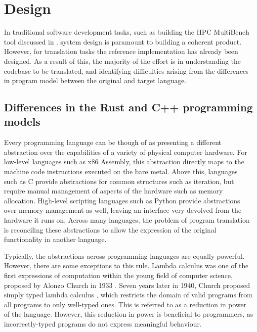 \section{Design}
\label{sec:translation-design}

In traditional software development tasks, such as building the HPC MultiBench tool discussed in , system design is paramount to building a coherent product. However, for translation tasks the reference implementation has already been designed. As a result of this, the majority of the effort is in understanding the codebase to be translated, and identifying difficulties arising from the differences in program model between the original and target language.

\subsection{Differences in the Rust and C++ programming models}
\label{sec:rust-cpp-programming-models}

Every programming language can be though of as presenting a different abstraction over the capabilities of a variety of physical computer hardware. For low-level languages such as x86 Assembly, this abstraction directly maps to the machine code instructions executed on the bare metal. Above this, languages such as C provide abstractions for common structures such as iteration, but require manual management of aspects of the hardware such as memory allocation. High-level scripting languages such as Python provide abstractions over memory management as well, leaving an interface very devolved from the hardware it runs on. Across many languages, the problem of program translation is reconciling these abstractions to allow the expression of the original functionality in another language.

Typically, the abstractions across programming languages are equally powerful. However, there are some exceptions to this rule. Lambda calculus was one of the first expressions of computation within the young field of computer science, proposed by Alonzo Church in 1933 \cite{church1932set}. Seven years later in 1940, Church proposed simply typed lambda calculus \cite{church1940formulation}, which restricts the domain of valid programs from all programs to only well-typed ones. This is referred to as a reduction in power of the language. However, this reduction in power is beneficial to programmers, as incorrectly-typed programs do not express meaningful behaviour.

